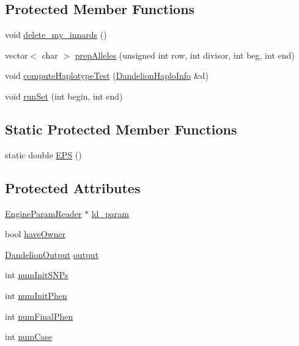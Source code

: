 \subsection*{Protected Member Functions}
\begin{DoxyCompactItemize}
\item 
void \hyperlink{classDandelion_adafc0b99e228f6bdfba301f129e17145}{delete\_\-my\_\-innards} ()
\item 
vector$<$ char $>$ \hyperlink{classDandelion_ac02d091e91f5ffc64665e1c986a843c4}{prepAlleles} (unsigned int row, int divisor, int beg, int end)
\item 
void \hyperlink{classDandelion_a7d005ed3065f6d59bcdb569ac60a80d1}{computeHaplotypeTest} (\hyperlink{structDandelionHaploInfo}{DandelionHaploInfo} \&d)
\item 
void \hyperlink{classDandelion_adf05e6be9d35362f836768eb1b7f22d8}{runSet} (int begin, int end)
\end{DoxyCompactItemize}
\subsection*{Static Protected Member Functions}
\begin{DoxyCompactItemize}
\item 
static double \hyperlink{classDandelion_a8679c05d30fc55999636726595c070ad}{EPS} ()
\end{DoxyCompactItemize}
\subsection*{Protected Attributes}
\begin{DoxyCompactItemize}
\item 
\hyperlink{classEngineParamReader}{EngineParamReader} $\ast$ \hyperlink{classDandelion_a6be9455eb19cec16f641f4b1e38dd12f}{ld\_\-param}
\item 
bool \hyperlink{classDandelion_a515b2e24d0761fb1278fc61818af02da}{haveOwner}
\item 
\hyperlink{classDandelionOutput}{DandelionOutput} \hyperlink{classDandelion_ae3ac17eb2241e0c91255789c941dde82}{output}
\item 
int \hyperlink{classDandelion_af9f4a50b7b9d5ec2876f87244f171fde}{numInitSNPs}
\item 
int \hyperlink{classDandelion_aa966dd7a7a67dd93522d912aacba581c}{numInitPhen}
\item 
int \hyperlink{classDandelion_a7cb5314914aee687a770cfa31af761f4}{numFinalPhen}
\item 
int \hyperlink{classDandelion_a1b502dbaf2cbdcaaaf375632840d562e}{numCase}
\end{DoxyCompactItemize}


